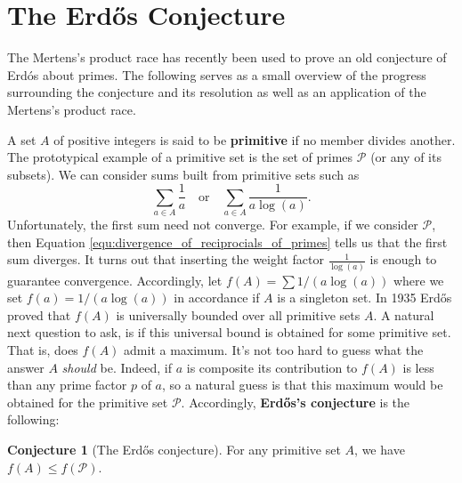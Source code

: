 \documentclass[12pt,reqno]{amsart}
\theoremstyle{definition}
\newtheorem{conjecture}[theorem]{Conjecture}
\numberwithin{equation}{section}
\begin{document}
\section{The Erd\H{o}s Conjecture}
The Mertens's product race has recently been used to prove an old conjecture of Erd\'os about primes. The following serves as a small overview of the progress surrounding the conjecture and its resolution as well as an application of the Mertens's product race.

A set $A$ of positive integers is said to be \textbf{primitive} if no member divides another. The prototypical example of a primitive set is the set of primes $\mathcal{P}$ (or any of its subsets). We can consider sums built from primitive sets such as
\[
    \sum_{a \in A}\frac{1}{a} \quad \text{or} \quad \sum_{a \in A}\frac{1}{a\log(a)}.
\]
Unfortunately, the first sum need not converge. For example, if we consider $\mathcal{P}$, then Equation \ref{equ:divergence_of_reciprocials_of_primes} tells us that the first sum diverges. It turns out that inserting the weight factor $\frac{1}{\log(a)}$ is enough to guarantee convergence. Accordingly, let $f(A) = \sum1/(a\log(a))$ where we set $f(a) = 1/(a\log(a))$ in accordance if $A$ is a singleton set. In 1935 Erd\H{o}s proved that $f(A)$ is universally bounded over all primitive sets $A$. A natural next question to ask, is if this universal bound is obtained for some primitive set. That is, does $f(A)$ admit a maximum. It's not too hard to guess what the answer $A$ \textit{should} be. Indeed, if $a$ is composite its contribution to $f(A)$ is less than any prime factor $p$ of $a$, so a natural guess is that this maximum would be obtained for the primitive set $\mathcal{P}$. Accordingly, \textbf{Erd\H{o}s's conjecture} is the following:

\begin{conjecture}[The Erd\H{o}s conjecture]\label{conj:Erdos_conjecture}
    For any primitive set $A$, we have $f(A) \le f(\mathcal{P})$.
\end{conjecture}
\end{document}
